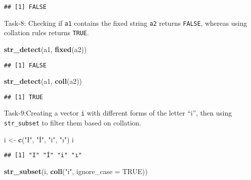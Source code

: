 \documentclass[
]{article}
\newenvironment{Shaded}{\begin{snugshade}}{\end{snugshade}}
\newcommand{\AttributeTok}[1]{\textcolor[rgb]{0.13,0.29,0.53}{#1}}
\newcommand{\ConstantTok}[1]{\textcolor[rgb]{0.56,0.35,0.01}{#1}}
\newcommand{\FunctionTok}[1]{\textcolor[rgb]{0.13,0.29,0.53}{\textbf{#1}}}
\newcommand{\NormalTok}[1]{#1}
\newcommand{\OtherTok}[1]{\textcolor[rgb]{0.56,0.35,0.01}{#1}}
\newcommand{\StringTok}[1]{\textcolor[rgb]{0.31,0.60,0.02}{#1}}
\begin{document}
\begin{verbatim}
## [1] FALSE
\end{verbatim}

Task-8: Checking if \texttt{a1} contains the fixed string \texttt{a2}
returns \texttt{FALSE}, whereas using collation rules returns
\texttt{TRUE}.

\begin{Shaded}
\begin{Highlighting}[]
\FunctionTok{str\_detect}\NormalTok{(a1, }\FunctionTok{fixed}\NormalTok{(a2))}
\end{Highlighting}
\end{Shaded}

\begin{verbatim}
## [1] FALSE
\end{verbatim}

\begin{Shaded}
\begin{Highlighting}[]
\FunctionTok{str\_detect}\NormalTok{(a1, }\FunctionTok{coll}\NormalTok{(a2))}
\end{Highlighting}
\end{Shaded}

\begin{verbatim}
## [1] TRUE
\end{verbatim}

Task-9:Creating a vector \texttt{i} with different forms of the letter
``i'', then using \texttt{str\_subset} to filter them based on
collation.

\begin{Shaded}
\begin{Highlighting}[]
\NormalTok{i }\OtherTok{\textless{}{-}} \FunctionTok{c}\NormalTok{(}\StringTok{"I"}\NormalTok{, }\StringTok{"İ"}\NormalTok{, }\StringTok{"i"}\NormalTok{, }\StringTok{"ı"}\NormalTok{)}
\NormalTok{i}
\end{Highlighting}
\end{Shaded}

\begin{verbatim}
## [1] "I" "İ" "i" "ı"
\end{verbatim}

\begin{Shaded}
\begin{Highlighting}[]
\FunctionTok{str\_subset}\NormalTok{(i, }\FunctionTok{coll}\NormalTok{(}\StringTok{"i"}\NormalTok{, }\AttributeTok{ignore\_case =} \ConstantTok{TRUE}\NormalTok{))}
\end{Highlighting}
\end{Shaded}
\end{document}
